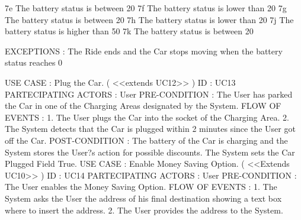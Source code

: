 \documentclass[12pt]{article}
\begin{document}
7e 	The battery status is between 20%
7f The battery status is lower than 20%
7g The battery status is between 20%
7h The battery status is lower than 20%
7j The battery status is higher than 50%
7k The battery status is between 20%

EXCEPTIONS : 
The Ride ends and the Car stops moving when the battery status reaches 0%

USE CASE : Plug the Car.  ( <<extends UC12>> )
ID : UC13
PARTECIPATING ACTORS : User 
PRE-CONDITION : The User has parked the Car in one of the Charging Areas designated by the System. 
FLOW OF EVENTS :
1. The User plugs the Car into the socket of the Charging Area. 
2. The System detects that the Car is plugged within 2 minutes since the User got off the Car.
POST-CONDITION :  
The battery of the Car is charging and the System stores the User?s action for possible discounts.
The System sets the Car Plugged Field True.
USE CASE : Enable Money Saving Option. ( <<Extends UC10>> )
ID : UC14
PARTECIPATING ACTORS : User 
PRE-CONDITION : The User enables the Money Saving Option.
FLOW OF EVENTS : 
1. The System asks the User the address of his final destination showing a text box where to insert the address.
2. The User provides the address to the System.
\end{document}
